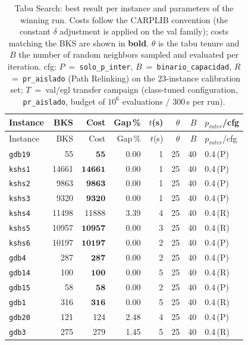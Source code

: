 \begingroup\scriptsize
\begin{longtable}{lrrrrrrl}
\caption{Tabu Search: best result per instance and parameters of the winning run. Costs follow the CARPLIB convention (the constant $\delta$ adjustment is applied on the val family); costs matching the BKS are shown in \textbf{bold}. $\theta$ is the tabu tenure and $B$ the number of random neighbors sampled and evaluated per iteration. cfg: $P$~=~\texttt{solo\_p\_inter}, $B$~=~\texttt{binario\_capacidad}, $R$~=~\texttt{pr\_aislado} (Path Relinking) on the 23-instance calibration set; $T$~=~val/egl transfer campaign (class-tuned configuration, \texttt{pr\_aislado}, budget of $10^6$ evaluations / 300\,s per run).}\label{tab:ts-per-instance}\\
\toprule
Instance & BKS & Cost & Gap\,\% & $t$(s) & $\theta$ & $B$ & $p_{inter}$/cfg \\
\midrule
\endfirsthead
\toprule
Instance & BKS & Cost & Gap\,\% & $t$(s) & $\theta$ & $B$ & $p_{inter}$/cfg \\
\midrule
\endhead
\bottomrule
\endfoot
\texttt{gdb19} & 55 & $\mathbf{55}$ & 0.00 & 1 & 25 & 40 & 0.4\,(P) \\
\texttt{kshs1} & 14661 & $\mathbf{14661}$ & 0.00 & 1 & 25 & 40 & 0.4\,(P) \\
\texttt{kshs2} & 9863 & $\mathbf{9863}$ & 0.00 & 1 & 25 & 40 & 0.4\,(P) \\
\texttt{kshs3} & 9320 & $\mathbf{9320}$ & 0.00 & 1 & 25 & 40 & 0.4\,(P) \\
\texttt{kshs4} & 11498 & 11888 & 3.39 & 4 & 25 & 40 & 0.4\,(R) \\
\texttt{kshs5} & 10957 & $\mathbf{10957}$ & 0.00 & 3 & 25 & 40 & 0.4\,(R) \\
\texttt{kshs6} & 10197 & $\mathbf{10197}$ & 0.00 & 2 & 25 & 40 & 0.4\,(P) \\
\texttt{gdb4} & 287 & $\mathbf{287}$ & 0.00 & 2 & 25 & 40 & 0.4\,(P) \\
\texttt{gdb14} & 100 & $\mathbf{100}$ & 0.00 & 5 & 25 & 40 & 0.4\,(R) \\
\texttt{gdb15} & 58 & $\mathbf{58}$ & 0.00 & 2 & 25 & 40 & 0.4\,(P) \\
\texttt{gdb1} & 316 & $\mathbf{316}$ & 0.00 & 5 & 25 & 40 & 0.4\,(R) \\
\texttt{gdb20} & 121 & 124 & 2.48 & 4 & 25 & 40 & 0.4\,(P) \\
\texttt{gdb3} & 275 & 279 & 1.45 & 5 & 25 & 40 & 0.4\,(R) \\

\end{longtable}
